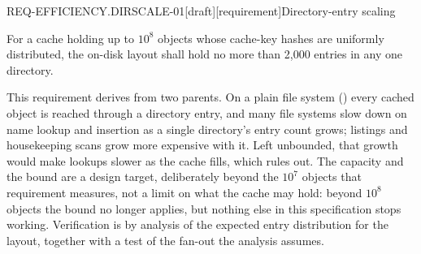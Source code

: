 \begin{requirement}{REQ-EFFICIENCY.DIRSCALE-01}[draft][requirement]{Directory-entry scaling}


  For a cache holding up to $10^8$ objects whose cache-key hashes are
  uniformly distributed, the on-disk layout shall hold no more than 2,000
  entries in any one directory.

  This requirement derives from two parents. On a plain file system
  () every cached object is reached
  through a directory entry, and many file systems slow down on name lookup
  and insertion as a single directory's entry count grows; listings and
  housekeeping scans grow more expensive with it. Left unbounded, that growth
  would make lookups slower as the cache fills, which
   rules out. The capacity and the bound are
  a design target, deliberately beyond the $10^7$ objects that requirement
  measures, not a limit on what the cache may hold: beyond $10^8$ objects the
  bound no longer applies, but nothing else in this specification stops
  working. Verification is by analysis of the expected
  entry distribution for the layout, together with a test of the fan-out the
  analysis assumes.



\end{requirement}


